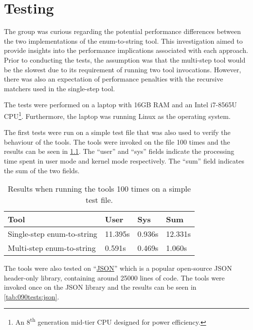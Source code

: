 \chapter{Testing}
The group was curious regarding the potential performance differences between the two implementations of the enum-to-string tool.
This investigation aimed to provide insights into the performance implications associated with each approach.
Prior to conducting the tests, the assumption was that the multi-step tool would be the slowest due to its requirement of running two tool invocations.
However, there was also an expectation of performance penalties with the recursive matchers used in the single-step tool.

The tests were performed on a laptop with 16GB RAM and an Intel i7-8565U CPU\footnote{
    An 8\textsuperscript{th} generation mid-tier CPU designed for power efficiency.
}. Furthermore, the laptop was running Linux as the operating system.

The first tests were run on a simple test file that was also used to verify the behaviour of the tools. The tools were invoked on the file 100 times and the results can be seen in \cref{tab:090tests:simple}. The ``user'' and ``sys'' fields indicate the processing time spent in user mode and kernel mode respectively. The ``sum'' field indicates the sum of the two fields.

\begin{table}[H]
    \centering
    \begin{tabular}{|p{}|p{}|p{}|p{}|}
    \hline
    \rowcolor{gray!30}
    \textbf{Tool} & \textbf{User} & \textbf{Sys} & \textbf{Sum} \\ \hline
    Single-step enum-to-string & 11.395s & 0.936s & 12.331s \\ \hline
    Multi-step enum-to-string & 0.591s & 0.469s & 1.060s \\ \hline
    \end{tabular}
    \caption{Results when running the tools 100 times on a simple test file.}
    \label{tab:090tests:simple}
\end{table}
\vspace*{-1em}

The tools were also tested on ``\href{https://github.com/nlohmann/json}{JSON}'' which is a popular open-source JSON header-only library, containing around 25000 lines of code.
The tools were invoked once on the JSON library and the results can be seen in \cref{tab:090tests:json}.

